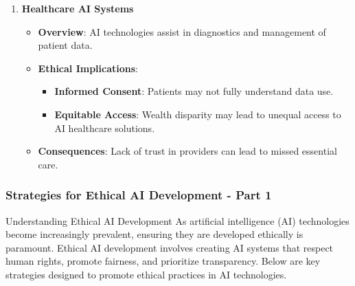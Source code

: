 \documentclass[aspectratio=169]{beamer}
\begin{document}
\begin{frame}[fragile]
\begin{enumerate}
        \item \textbf{Healthcare AI Systems}
            \begin{itemize}
                \item \textbf{Overview}: AI technologies assist in diagnostics and management of patient data.
                \item \textbf{Ethical Implications}:
                    \begin{itemize}
                        \item \textbf{Informed Consent}: Patients may not fully understand data use.
                        \item \textbf{Equitable Access}: Wealth disparity may lead to unequal access to AI healthcare solutions.
                    \end{itemize}
                \item \textbf{Consequences}: Lack of trust in providers can lead to missed essential care.
            \end{itemize}
    \end{enumerate}
\end{frame}

\begin{frame}[fragile]
    \frametitle{Strategies for Ethical AI Development - Part 1}
    \begin{block}{Understanding Ethical AI Development}
        As artificial intelligence (AI) technologies become increasingly prevalent, ensuring they are developed ethically is paramount. Ethical AI development involves creating AI systems that respect human rights, promote fairness, and prioritize transparency. Below are key strategies designed to promote ethical practices in AI technologies.
    \end{block}
\end{frame}
\end{document}
